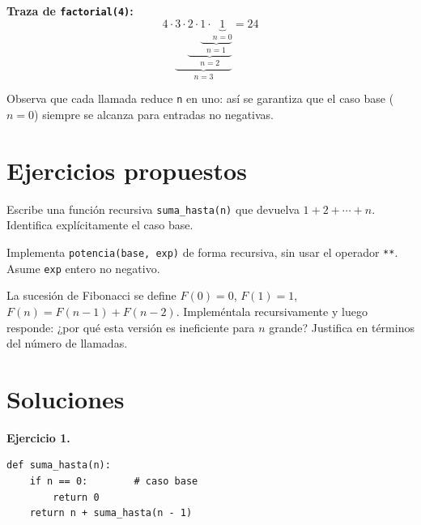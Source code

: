 \documentclass[11pt,a4paper]{article}
\begin{document}
\noindent\textbf{Traza de \texttt{factorial(4)}:}
\[
4 \cdot \underbrace{3 \cdot \underbrace{2 \cdot \underbrace{1 \cdot \underbrace{1}_{n=0}}_{n=1}}_{n=2}}_{n=3} = 24
\]

\begin{nota}
Observa que cada llamada reduce \texttt{n} en uno: así se garantiza que el
caso base ($n=0$) siempre se alcanza para entradas no negativas.
\end{nota}

\section{Ejercicios propuestos}

\begin{ejercicio}[básico]
Escribe una función recursiva \texttt{suma\_hasta(n)} que devuelva
$1 + 2 + \cdots + n$. Identifica explícitamente el caso base.
\end{ejercicio}

\begin{ejercicio}[intermedio]
Implementa \texttt{potencia(base, exp)} de forma recursiva, sin usar el
operador \texttt{**}. Asume \texttt{exp} entero no negativo.
\end{ejercicio}

\begin{ejercicio}[desafío]
La sucesión de Fibonacci se define $F(0)=0$, $F(1)=1$,
$F(n)=F(n-1)+F(n-2)$. Impleméntala recursivamente y luego responde:
¿por qué esta versión es ineficiente para $n$ grande? Justifica en términos
del número de llamadas.
\end{ejercicio}

\newpage
\section*{Soluciones}

\textbf{Ejercicio 1.}
\begin{lstlisting}
def suma_hasta(n):
    if n == 0:        # caso base
        return 0
    return n + suma_hasta(n - 1)
\end{lstlisting}
\end{document}
